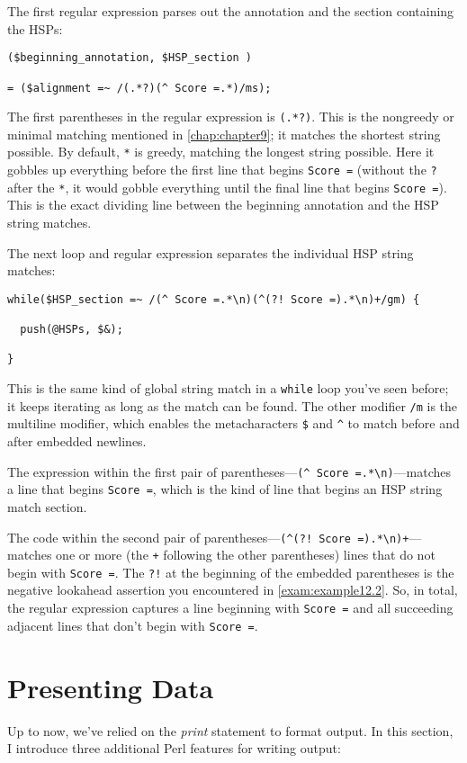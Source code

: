 The first regular expression parses out the annotation and the section containing the HSPs: 

\begin{lstlisting}
($beginning_annotation, $HSP_section )

= ($alignment =~ /(.*?)(^ Score =.*)/ms);
\end{lstlisting}

The first parentheses in the regular expression is \verb|(.*?)|. This is the nongreedy or minimal matching mentioned in \autoref{chap:chapter9}; it matches the shortest string possible. By default, \verb|*| is greedy, matching the longest string possible. Here it gobbles up everything before the first line that begins \verb|Score =| (without the \verb|?| after the \verb|*|, it would gobble everything until the final line that begins \verb|Score =|). This is the exact dividing line between the beginning annotation and the HSP string matches.

The next loop and regular expression separates the individual HSP string matches: 

\begin{lstlisting}
while($HSP_section =~ /(^ Score =.*\n)(^(?! Score =).*\n)+/gm) {
  
  push(@HSPs, $&);

}
\end{lstlisting}

This is the same kind of global string match in a \verb|while| loop you've seen before; it keeps iterating as long as the match can be found. The other modifier \verb|/m| is the multiline modifier, which enables the metacharacters \verb|$| and \verb|^| to match before and after embedded newlines.

The expression within the first pair of parentheses—\verb|(^ Score =.*\n)|—matches a line that begins \verb|Score =|, which is the kind of line that begins an HSP string match section.

The code within the second pair of parentheses—\verb|(^(?! Score =).*\n)+|—matches one or more (the \verb|+| following the other parentheses) lines that do not begin with \verb|Score =|. The \verb|?!| at the beginning of the embedded parentheses is the negative lookahead assertion you encountered in \autoref{exam:example12.2}. So, in total, the regular expression captures a line beginning with \verb|Score =| and all succeeding adjacent lines that don't begin with \verb|Score =|. 

\section{Presenting Data}
Up to now, we've relied on the \textit{print} statement to format output. In this section, I introduce three additional Perl features for writing output:

